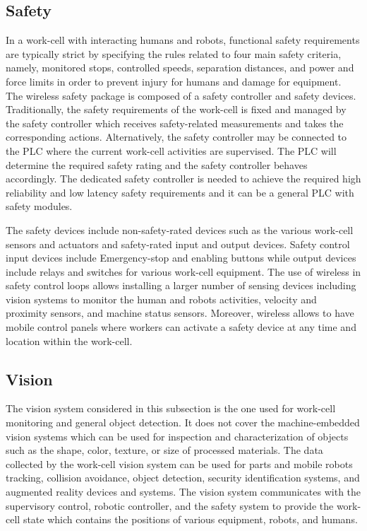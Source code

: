 \subsection{Safety}\label{sysml:sec:safety}

In a work-cell with interacting humans and robots, functional safety requirements are typically strict by specifying the rules related to four main safety criteria, namely, monitored stops, controlled speeds, separation distances, and power and force limits in order to prevent injury for humans and damage for equipment. The wireless safety package is composed of a safety controller and safety devices. Traditionally, the safety requirements of the work-cell is fixed and managed by the safety controller which receives safety-related measurements and takes the corresponding actions. Alternatively, the safety controller may be connected to the PLC where the current work-cell activities are supervised.  The PLC will determine the required safety rating and the safety controller behaves accordingly. The dedicated safety controller is needed to achieve the required high reliability and low latency safety requirements and it can be a general PLC with safety modules. 

The safety devices include non-safety-rated devices such as the various work-cell sensors and actuators and safety-rated input and output devices. Safety control input devices include Emergency-stop and enabling buttons while output devices include relays and switches for various work-cell equipment. The use of wireless in safety control loops allows installing a larger number of sensing devices including vision systems to monitor the human and robots activities, velocity and proximity sensors, and machine status sensors. Moreover, wireless allows to have mobile control panels where workers can activate a safety device at any time and location within the work-cell.        

\subsection{Vision}\label{sysml:sec:vision}
The vision system considered in this subsection is the one used for work-cell monitoring and general object detection. It does not cover the machine-embedded vision systems which can be used for inspection and characterization of objects such as the shape, color, texture, or size of processed materials. The data collected by the work-cell vision system can be used for parts and mobile robots tracking, collision avoidance, object detection, security identification systems, and augmented reality devices and systems. The vision system communicates with the supervisory control, robotic controller, and the safety system to provide the work-cell state which contains the positions of various equipment, robots, and humans. 

